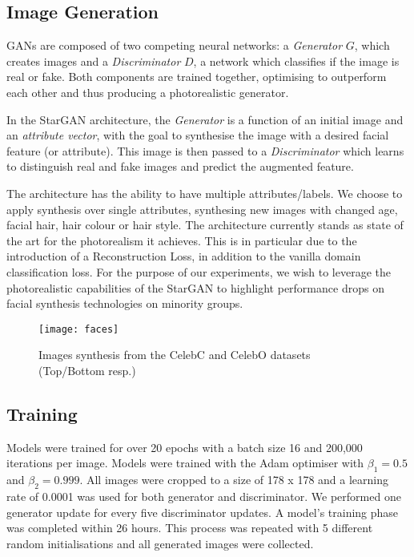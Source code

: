 \documentclass[10pt,twocolumn,letterpaper]{article}
\begin{document}
\subsection{Image Generation}
GANs are composed of two competing neural networks: a \textit{Generator} $G$, which creates images and a \textit{Discriminator} $D$, a network which classifies if the image is real or fake. Both components are trained together, optimising to outperform each other and thus producing a photorealistic generator.

In the StarGAN architecture, the \textit{Generator} is a function of an initial image and an \textit{attribute vector}, with the goal to synthesise the image with a desired facial feature (or attribute). This image is then passed to a \textit{Discriminator} which learns to distinguish real and fake images and predict the augmented feature.

The architecture has the ability to have multiple attributes/labels. We choose to apply synthesis over single attributes, synthesing new images with changed age, facial hair, hair colour or hair style. The architecture currently stands as state of the art for the photorealism it achieves. This is in particular due to the introduction of a Reconstruction Loss, in addition to the vanilla domain classification loss. For the purpose of our experiments, we wish to leverage the photorealistic capabilities of the StarGAN to highlight performance drops on facial synthesis technologies on minority groups.


\begin{figure*}[h!]
\begin{center}
\texttt{[image: faces]}
\end{center}
  \caption{Images synthesis from the CelebC and CelebO datasets (Top/Bottom resp.) \label{generated}}

\end{figure*}

\subsection{Training}

Models were trained for over 20 epochs with a batch size 16 and 200,000 iterations per image. Models were trained with the Adam optimiser with $\beta_{1}=0.5$ and $\beta_{2}=0.999$. All images were cropped to a size of 178 x 178 and a learning rate of 0.0001 was used for both generator and discriminator. We performed one generator update for every five discriminator updates. A model's training phase was completed within 26 hours. This process was repeated with 5 different random initialisations and all generated images were collected. 
\end{document}
